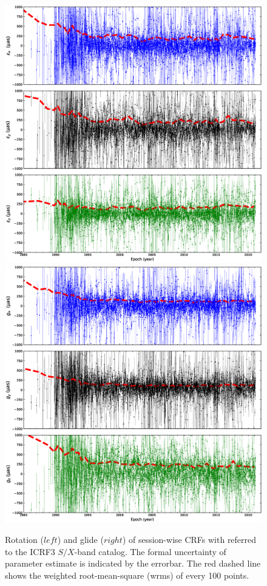 \documentclass{aa}
\begin{document}
\begin{appendix}
 \begin{figure}[hbtp]
   \centering
   \includegraphics[width=\columnwidth]{figs/orient-from-sess-crf}  %
   \includegraphics[width=\columnwidth]{figs/glide-from-sess-crf}  %
   \caption[]{\label{fig:sess-wise-pmt} %
	Rotation ($left$) and glide ($right$) of session-wise CRFs with referred to
	the ICRF3 $S/X$-band catalog.
	The formal uncertainty of parameter estimate is indicated by the errorbar.
	The red dashed line shows the weighted root-mean-square (wrms) of every 100 points.
   }
 \end{figure}

\end{appendix}
\end{document}
